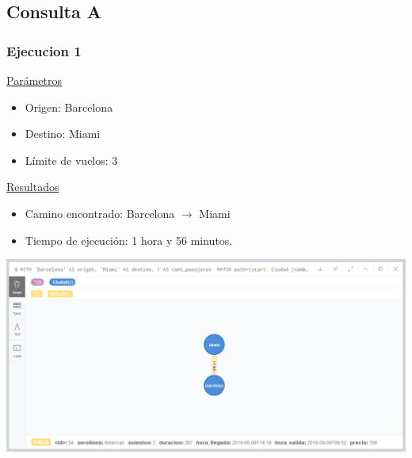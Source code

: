 \documentclass[a4paper,11pt]{article}
\begin{document}
\subsection*{Consulta A}
\subsubsection*{Ejecucion 1}
\noindent
\underline{Parámetros}
\begin{itemize}
\item Origen: Barcelona
\item Destino: Miami
\item Límite de vuelos: 3
\end{itemize}
\underline{Resultados}
\begin{itemize}
\item Camino encontrado: Barcelona $\rightarrow$ Miami
\item Tiempo de ejecución: 1 hora y 56 minutos.
\end{itemize}
\begin{center}
\includegraphics[scale=0.40]{./imagenes/consultaA.png}
\end{center}
\end{document}
